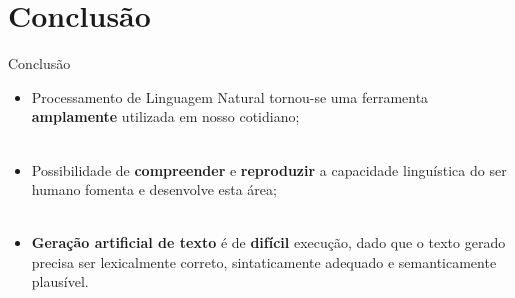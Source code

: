 \section{Conclusão}
\label{s.conclusion}

\begin{frame}{Conclusão}
	\begin{itemize}
		\justifying
		\item Processamento de Linguagem Natural tornou-se uma ferramenta \textbf{amplamente} utilizada em nosso cotidiano;
		\\~\\
		\item Possibilidade de \textbf{compreender} e \textbf{reproduzir} a capacidade linguística do ser humano fomenta e desenvolve esta área;
		\\~\\
		\item \textbf{Geração artificial de texto} é de \textbf{difícil} execução, dado que o texto gerado precisa ser lexicalmente correto, sintaticamente adequado e semanticamente plausível.
	\end{itemize}

\end{frame}